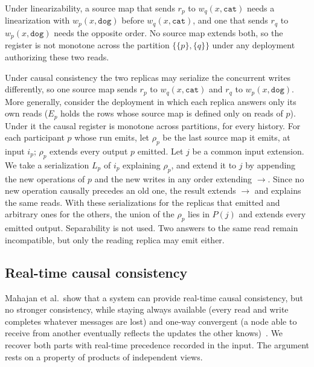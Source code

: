 \documentclass[sigconf]{cidr-2027}
\theoremstyle{remark}
\newcommand{\indesc}{input extension\xspace} %
\newcommand{\outrel}{extends\xspace}          %
\newcommand{\fiber}[1]{P(#1)}
\newcommand{\dog}{\texttt{dog}}
\newcommand{\catv}{\texttt{cat}}
\begin{document}
\color{blue!70!black}Under linearizability, a source map that sends $r_p$ to $w_q(x,\catv)$ needs a
linearization with $w_p(x,\dog)$ before $w_q(x,\catv)$, and one that sends
$r_q$ to $w_p(x,\dog)$ needs the opposite order.
No source map \outrel both, so the register is not monotone across the
partition $\{\{p\},\{q\}\}$ under any deployment authorizing these two reads.\color{black}

\color{blue!70!black}Under causal consistency the two replicas may serialize the concurrent writes
differently, so one source map sends $r_p$ to $w_q(x,\catv)$ and $r_q$ to
$w_p(x,\dog)$.  More generally, consider the deployment in which each replica
answers only its own reads ($E_p$ holds the rows whose source map is defined
only on reads of $p$).  Under it the causal register is monotone across
partitions, for every history.  For each participant $p$ whose run emits, let
$\rho_p$ be the last source map it emits, at input $i_p$; $\rho_p$ \outrel every
output $p$ emitted.  Let $j$ be a common \indesc.  We take a serialization
$L_p$ of $i_p$ explaining $\rho_p$, and extend it to $j$ by appending the new
operations of $p$ and the new writes in any order extending $\to$.  Since no
new operation causally precedes an old one, the result extends $\to$ and
explains the same reads.  With these serializations for the replicas that
emitted and arbitrary ones for the others, the union of the $\rho_p$ lies in
$\fiber{j}$ and \outrel every emitted output.  Separability is
not used.  Two answers to the same read remain incompatible, but only the
reading replica may emit either.\color{black}

\subsection{Real-time causal consistency}
\label{app:rtc}

\color{blue!70!black}Mahajan et al.\ show that a system can provide real-time causal consistency,
but no stronger consistency, while staying always available (every read and
write completes whatever messages are lost) and one-way convergent (a node
able to receive from another eventually reflects the updates the other
knows)~\cite{mahajan2011consistency}.  We recover both parts with real-time
precedence recorded in the input.  The argument rests on a property of
products of independent views.\color{black}
\end{document}
